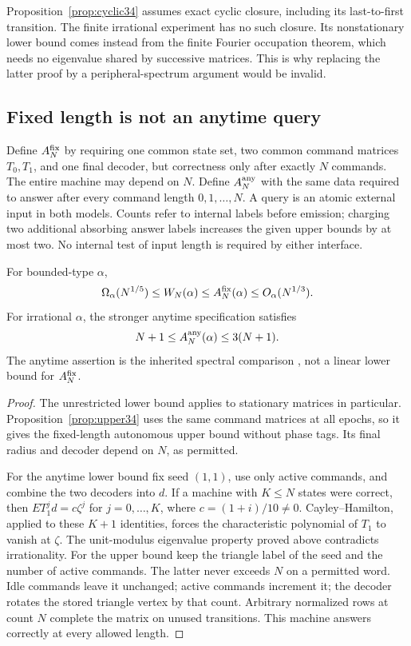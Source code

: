 Proposition~\ref{prop:cyclic34} assumes exact cyclic closure, including its
last-to-first transition. The finite irrational experiment has no such
closure. Its nonstationary lower bound comes instead from the finite
Fourier occupation theorem, which needs no eigenvalue shared by successive
matrices. This is why replacing the latter proof by a peripheral-spectrum
argument would be invalid.

\subsection{Fixed length is not an anytime query}
Define $A_N^{\rm fix}$ by requiring one common state set, two common command
matrices $T_0,T_1$, and one final decoder, but correctness only after
exactly $N$ commands. The entire machine may depend on $N$. Define
$A_N^{\rm any}$ with the same data required to answer after every command
length $0,1,\ldots,N$. A query is an atomic external input in both models.
Counts refer to internal labels before emission; charging two additional
absorbing answer labels increases the given upper bounds by at most two.
No internal test of input length is required by either interface.

\begin{corollary}
\label{cor:autonomy34}
For bounded-type $\alpha$,
\[
 \Omega_\alpha(N^{1/5})\le W_N(\alpha)\le A_N^{\rm fix}(\alpha)
                                      \le O_\alpha(N^{1/3}).
\]
For irrational $\alpha$, the stronger anytime specification satisfies
\[
                  N+1\le A_N^{\rm any}(\alpha)\le3(N+1).
\]
The anytime assertion is the inherited spectral comparison \cite{GTF33},
not a linear lower bound for $A_N^{\rm fix}$.
\end{corollary}
\begin{proof}
The unrestricted lower bound applies to stationary matrices in particular.
Proposition~\ref{prop:upper34} uses the same command matrices at all epochs,
so it gives the fixed-length autonomous upper bound without phase tags.
Its final radius and decoder depend on $N$, as permitted.

For the anytime lower bound fix seed $(1,1)$, use only active commands,
and combine the two decoders into $d$. If a machine with $K\le N$ states
were correct, then $E T_1^j d=c\zeta^j$ for $j=0,\ldots,K$, where
$c=(1+i)/10\ne0$. Cayley--Hamilton, applied to these $K+1$ identities,
forces the characteristic polynomial of $T_1$ to vanish at $\zeta$.
The unit-modulus eigenvalue property proved above contradicts irrationality.
For the upper bound keep the triangle label of the seed and the number
of active commands. The latter never exceeds $N$ on a permitted word.
Idle commands leave it unchanged; active commands increment it; the decoder
rotates the stored triangle vertex by that count. Arbitrary normalized
rows at count $N$ complete the matrix on unused transitions. This machine
answers correctly at every allowed length.
\end{proof}
